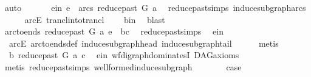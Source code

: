 \begin{isabellebody}
\ auto\ \isanewline
\ \ \isamarkupfalse%
\ \isamarkupfalse%
\ e{\isacharunderscore}{\kern0pt}in{}{\isacharcolon}{\kern0pt}\ {\isachardoublequoteopen}e\ {\isasymin}\ arcs\ {\isacharparenleft}{\kern0pt}reduce{\isacharunderscore}{\kern0pt}past\ G\ a{\isacharparenright}{\kern0pt}{\isachardoublequoteclose}\ \isamarkupfalse%
\ reduce{\isacharunderscore}{\kern0pt}past{\isachardot}{\kern0pt}simps\ induce{\isacharunderscore}{\kern0pt}subgraph{\isacharunderscore}{\kern0pt}arcs\isanewline
\ \ \ \ \isamarkupfalse%
\ arcE\ trancl{\isacharunderscore}{\kern0pt}into{\isacharunderscore}{\kern0pt}trancl\isanewline
\ \ \ \ b{\isacharunderscore}{\kern0pt}in\ \isamarkupfalse%
\ blast\ \isanewline
\ \ \isamarkupfalse%
\ \isamarkupfalse%
\ {\isachardoublequoteopen}arc{\isacharunderscore}{\kern0pt}to{\isacharunderscore}{\kern0pt}ends\ {\isacharparenleft}{\kern0pt}reduce{\isacharunderscore}{\kern0pt}past\ G\ a{\isacharparenright}{\kern0pt}\ e\ {\isacharequal}{\kern0pt}\ {\isacharparenleft}{\kern0pt}b{\isacharcomma}{\kern0pt}c{\isacharparenright}{\kern0pt}{\isachardoublequoteclose}\ \isamarkupfalse%
\ reduce{\isacharunderscore}{\kern0pt}past{\isachardot}{\kern0pt}simps\ \isamarkupfalse%
\ e{\isacharunderscore}{\kern0pt}in\isanewline
\ \ arcE\ arc{\isacharunderscore}{\kern0pt}to{\isacharunderscore}{\kern0pt}ends{\isacharunderscore}{\kern0pt}def\ induce{\isacharunderscore}{\kern0pt}subgraph{\isacharunderscore}{\kern0pt}head\ induce{\isacharunderscore}{\kern0pt}subgraph{\isacharunderscore}{\kern0pt}tail\isanewline
\ \ \ \ \isamarkupfalse%
\ metis\ \ \isanewline
\ \ \isamarkupfalse%
\ \isamarkupfalse%
\ \ {\isachardoublequoteopen}b\ {\isasymrightarrow}\isactrlbsub reduce{\isacharunderscore}{\kern0pt}past\ G\ a\isactrlesub \ c{\isachardoublequoteclose}\ \isamarkupfalse%
\ e{\isacharunderscore}{\kern0pt}in{}\ wf{\isacharunderscore}{\kern0pt}digraph{\isachardot}{\kern0pt}dominatesI\ DAG{\isacharunderscore}{\kern0pt}axioms\isanewline
\ \ \ \ \isamarkupfalse%
\ {\isacharparenleft}{\kern0pt}metis\ reduce{\isacharunderscore}{\kern0pt}past{\isachardot}{\kern0pt}simps\ wellformed{\isacharunderscore}{\kern0pt}induce{\isacharunderscore}{\kern0pt}subgraph{\isacharparenright}{\kern0pt}\ \ \isanewline
\ \ \isamarkupfalse%
\ \isamarkupfalse%
\ {\isacharquery}{\kern0pt}case\ \isamarkupfalse%

\end{isabellebody}
